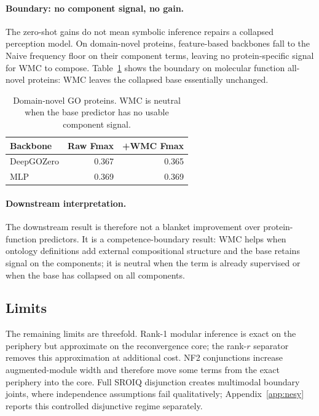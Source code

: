 \documentclass[letterpaper]{article}
\begin{document}
\paragraph{Boundary: no component signal, no gain.}
The zero-shot gains do not mean symbolic inference repairs a collapsed perception model. On domain-novel proteins, feature-based backbones fall to the Naive frequency floor on their component terms, leaving no protein-specific signal for WMC to compose. Table~\ref{tab:downstream-boundary} shows the boundary on molecular function all-novel proteins: WMC leaves the collapsed base essentially unchanged.

\begin{table}[t]\centering
\caption{Domain-novel GO proteins. WMC is neutral when the base predictor has no usable component signal.}\label{tab:downstream-boundary}
\footnotesize
\setlength{\tabcolsep}{4pt}
\begin{tabular}{@{}lrr@{}}
\toprule
Backbone & Raw Fmax & +WMC Fmax \\
\midrule
DeepGOZero & 0.367 & 0.365 \\
MLP & 0.369 & 0.369 \\
\bottomrule
\end{tabular}
\end{table}

\paragraph{Downstream interpretation.}
The downstream result is therefore not a blanket improvement over protein-function predictors. It is a competence-boundary result: WMC helps when ontology definitions add external compositional structure and the base retains signal on the components; it is neutral when the term is already supervised or when the base has collapsed on all components.

\subsection{Limits}\label{sec:limits}
The remaining limits are threefold. Rank-1 modular inference is exact on the periphery but approximate on the reconvergence core; the rank-$r$ separator removes this approximation at additional cost. NF2 conjunctions increase augmented-module width and therefore move some terms from the exact periphery into the core. Full SROIQ disjunction creates multimodal boundary joints, where independence assumptions fail qualitatively; Appendix~\ref{app:nesy} reports this controlled disjunctive regime separately.
\end{document}
